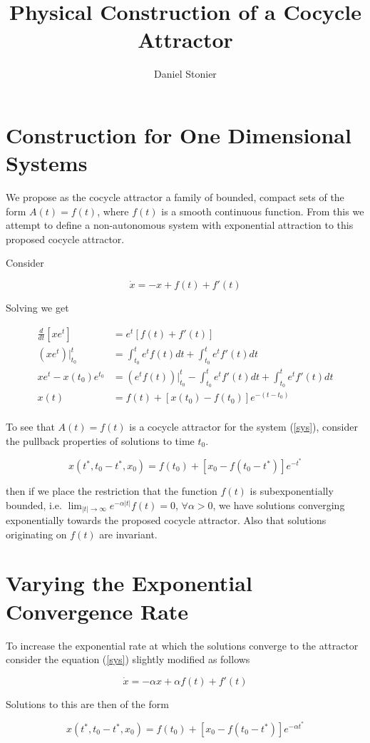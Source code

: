 \documentclass{article}
\title{Physical Construction of a Cocycle Attractor}
\author{Daniel Stonier}
\begin{document}
\maketitle

\section{Construction for One Dimensional Systems}

We propose as the cocycle attractor a family of bounded, compact sets of
the form $A(t) = f(t)$, where $f(t)$ is a smooth continuous function.
From this we attempt to define a non-autonomous system with exponential
attraction to this proposed cocycle attractor.

Consider

\begin{equation}
  \dot{x} = - x + f(t) + f'(t)
\label{sys}
\end{equation}

Solving we get

\begin{align*}
  \frac{d}{dt}[x e^t] & = e^t[f(t) + f'(t)] \\
  (xe^t)|_{t_0}^{t} & = \int_{t_0}^{t}e^tf(t)dt +
                \int_{t_0}^{t}e^tf'(t)dt \\
  xe^t - x(t_0)e^{t_0} & = (e^tf(t))|_{t_0}^{t} - \int_{t_0}^{t}e^tf'(t)dt
                + \int_{t_0}^{t}e^tf'(t)dt \\
  x(t) & = f(t) + [x(t_0) - f(t_0)]e^{-(t-t_0)} \\
\end{align*}

To see that $A(t) = f(t)$ is a cocycle attractor for the system
(\ref{sys}), consider the pullback properties of solutions to time $t_0$.

\[ x(t^*,t_0-t^*,x_0) = f(t_0) + [x_0 - f(t_0-t^*)]e^{-t^*} \]

then if we place the restriction that the function $f(t)$ is
subexponentially bounded, i.e. $\lim_{|t| \to \infty}e^{-\alpha|t|}f(t) =
0$, $\forall \alpha > 0$, we have solutions converging exponentially
towards the proposed cocycle attractor. Also that solutions originating on
$f(t)$ are invariant.

\section{Varying the Exponential Convergence Rate}

To increase the exponential rate at which the solutions converge to the
attractor consider the equation (\ref{sys}) slightly modified as follows

\begin{equation}
  \dot{x} = - \alpha x + \alpha f(t) + f'(t)
\label{sysa}
\end{equation}

Solutions to this are then of the form

\[ x(t^*,t_0-t^*,x_0) = f(t_0) + [x_0 - f(t_0-t^*)]e^{-\alpha t^*} \]
\end{document}
